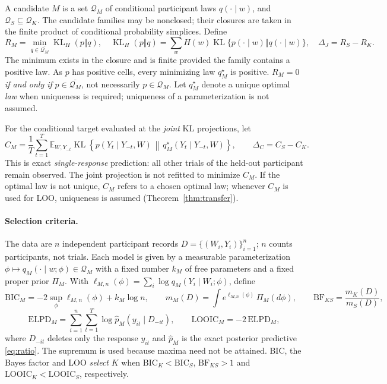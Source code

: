 \documentclass[11pt,letterpaper]{article}
\theoremstyle{plain}
\theoremstyle{definition}
\newcommand{\KL}{\operatorname{KL}}
\newcommand{\E}{\mathbb E}
\begin{document}
A candidate $M$ is a set $\mathcal Q_M$ of conditional participant laws $q(\cdot\mid w)$, and $\mathcal Q_S\subseteq\mathcal Q_K$. The candidate families may be nonclosed; their closures are taken in the finite product of conditional probability simplices. Define
\begin{equation}\label{eq:risks}
R_M=\min_{q\in\overline{\mathcal Q_M}}\KL_H(p\Vert q),\quad
\KL_H(p\Vert q)=\sum_wH(w)\KL\{p(\cdot\mid w)\Vert q(\cdot\mid w)\},\quad
\Delta_J=R_S-R_K.
\end{equation}
The minimum exists in the closure and is finite provided the family contains a positive law. As $p$ has positive cells, every minimizing law $q_M^\star$ is positive. $R_M=0$ \emph{if and only if} $p\in\overline{\mathcal Q_M}$, not necessarily $p\in\mathcal Q_M$. Let $q_M^\star$ denote a unique optimal \emph{law} when uniqueness is required; uniqueness of a parameterization is not assumed.

For the conditional target evaluated at the \emph{joint} KL projections, let
\begin{equation}\label{eq:conditionalrisk}
C_M=\frac1T\sum_{t=1}^T\E_{W,Y_{-t}}\KL\left\{p(Y_t\mid Y_{-t},W)\,\middle\Vert\,q_M^\star(Y_t\mid Y_{-t},W)\right\},
\qquad\Delta_C=C_S-C_K.
\end{equation}
This is exact \emph{single-response} prediction: all other trials of the held-out participant remain observed. The joint projection is not refitted to minimize $C_M$. If the optimal law is not unique, $C_M$ refers to a chosen optimal law; whenever $C_M$ is used for LOO, uniqueness is assumed (Theorem~\ref{thm:transfer}).

\paragraph{Selection criteria.} The data are $n$ independent participant records $D=\{(W_i,Y_i)\}_{i=1}^n$; $n$ counts participants, not trials. Each model is given by a measurable parameterization $\phi\mapsto q_M(\cdot\mid w;\phi)\in\mathcal Q_M$ with a fixed number $k_M$ of free parameters and a fixed proper prior $\Pi_M$. With $\ell_{M,n}(\phi)=\sum_i\log q_M(Y_i\mid W_i;\phi)$, define
\[
\mathrm{BIC}_M=-2\sup_\phi\ell_{M,n}(\phi)+k_M\log n,\qquad
m_M(D)=\int e^{\ell_{M,n}(\phi)}\,\Pi_M(d\phi),\qquad
\mathrm{BF}_{KS}=\frac{m_K(D)}{m_S(D)},
\]
\[
\mathrm{ELPD}_M=\sum_{i=1}^n\sum_{t=1}^T\log\widehat p_M(y_{it}\mid D_{-it}),\qquad
\mathrm{LOOIC}_M=-2\,\mathrm{ELPD}_M,
\]
where $D_{-it}$ deletes only the response $y_{it}$ and $\widehat p_M$ is the exact posterior predictive \eqref{eq:ratio}. The supremum is used because maxima need not be attained. BIC, the Bayes factor and LOO \emph{select} $K$ when $\mathrm{BIC}_K<\mathrm{BIC}_S$, $\mathrm{BF}_{KS}>1$ and $\mathrm{LOOIC}_K<\mathrm{LOOIC}_S$, respectively.
\end{document}
